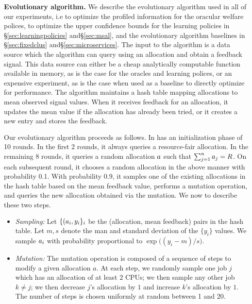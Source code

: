 
\textbf{Evolutionary algorithm.}
We describe the evolutionary algorithm used in all of our experiments,
i.e to optimize the profiled information for the oracular welfare polices, to optimize the upper
confidence bounds for the learning policies in \S\ref{sec:learningpolicies} and\S\ref{sec:msal},
and the evolutionary algorithm baselines in \S\ref{sec:fixedclus} and\S\ref{sec:microservices}.
The input to the algorithm is a data source which the algorithm can query using an allocation and
obtain a feedback signal.
This data source can either be
a cheap analytically computable function
available in memory, as is the case for the oracles and learning polices,
or an expensive experiment, as is the case when used as a baseline to directly optimize for
performance.
The algorithm maintains a hash table mapping allocations to mean observed signal values.
When it receives feedback for an allocation, it updates the mean value if the allocation has already
been tried, or it creates a new entry and stores the feedback.

Our evolutionary algorithm proceeds as follows.
In has an initialization phase of 10 rounds.
In the first 2 rounds, it always queries a resource-fair allocation.
In the remaining  8 rounds, it queries a random allocation $a$ such that
$\sum_{j=1}^na_{j}=R$.
On each subsequent round, it chooses a random allocation in the above manner with probability 0.1.
With probability 0.9, it samples one of the existing allocations in the hash table based on the
mean feedback value, performs a mutation operation, and queries the new allocation obtained
via the mutation.
We now to describe these two steps.
\begin{itemize}
\item \emph{Sampling:} Let $\{(a_{i}, y_i\}_i$ be the (allocation, mean feedback) pairs in the
hash table.
Let $m, s$ denote the man and standard deviation of the $\{y_i\}$  values.
We sample $a_{i}$ with probability proportional to $\exp\big((y_i-m)/s\big)$.
\item \emph{Mutation:}
The mutation operation is composed of a sequence of steps to modify a given allocation $a$.
At each step, we randomly sample one job $j$ which has an allocation of at least $2$ CPUs;
we then sample any other job $k\neq j$; we then decrease $j$'s allocation by $1$ and increase
$k$'s allocation by $1$.
The number of steps is chosen uniformly at random between 1 and 20.
\end{itemize}
